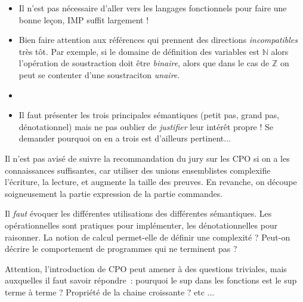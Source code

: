\documentclass{article}
\begin{document}
\secpieges

\begin{itemize}
    \item Il n'est pas nécessaire d'aller vers les langages fonctionnels
        pour faire une bonne leçon, IMP suffit largement !
    \item Bien faire attention aux références qui prennent des directions 
        \emph{incompatibles} très tôt. Par exemple, si le domaine de définition
        des variables est $\mathbb{N}$ alors l'opération de soustraction 
        doit être \emph{binaire}, alors que dans le cas de $\mathbb{Z}$ on peut 
        se contenter d'une soustraciton \emph{unaire}.
    \item {}
    \item Il faut présenter les trois principales sémantiques (petit pas, grand
        pas, dénotationnel) mais ne pas oublier de \emph{justifier} leur intérêt
        propre ! Se demander pourquoi on en a trois est d'ailleurs pertinent...
\end{itemize}

\secidees

Il n'est pas avisé de suivre la recommandation du jury sur les CPO si 
on a les connaissances suffisantes, car utiliser des unions ensemblistes 
complexifie l'écriture, la lecture, et augmente la taille des preuves.
En revanche, on découpe soigneusement la
partie expression de la partie commandes.

Il \emph{faut} évoquer les différentes utilisations des différentes
sémantiques. Les opérationnelles sont pratiques pour implémenter, les
dénotationnelles pour raisonner. La notion de calcul permet-elle de définir
une complexité ? Peut-on décrire le comportement de programmes qui ne
terminent pas ? 

Attention, l'introduction de CPO peut amener à des questions triviales, mais
auxquelles il faut savoir répondre~: pourquoi le sup dans les fonctions est
le sup terme à terme ? Propriété de la chaine croissante ? etc ...

\secquestionsclassiques
\end{document}
